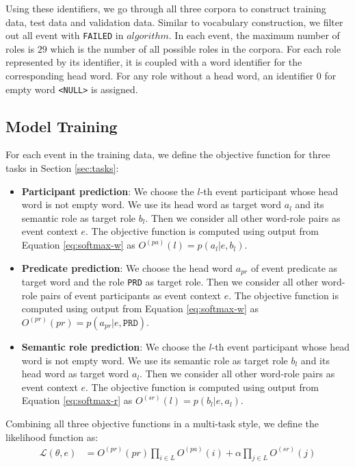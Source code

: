 \documentclass[a4paper]{article}
\begin{document}
Using these identifiers, we go through all three corpora to construct training data, test data and validation data. Similar to vocabulary construction, we filter out all event with \texttt{FAILED} in $algorithm$. In each event, the maximum number of roles is $29$ which is the number of all possible roles in the corpora. For each role represented by its identifier, it is coupled with a word identifier for the corresponding head word. For any role without a head word, an identifier $0$ for empty word \texttt{<NULL>} is assigned. 


\subsection{Model Training} \label{sec:training}
For each event in the training data, we define the objective function for three tasks in Section \ref{sec:tasks}:
\begin{itemize}
  \item  \textbf{Participant prediction}: We choose the $l$-th event participant whose head word is not empty word. We use its head word as target word $a_l$ and its semantic role as target role $b_l$. Then we consider all other word-role pairs as event context $e$. The objective function is computed using output from Equation \eqref{eq:softmax-w} as  $O^{(pa)}(l) = p(a_l | e, b_l)$. 
  \item  \textbf{Predicate prediction}: We choose the head word $a_{pr}$ of event predicate as target word and the role \texttt{PRD} as target role. Then we consider all other word-role pairs of event participants as event context $e$. The objective function is computed using output from Equation \eqref{eq:softmax-w} as  $O^{(pr)}(pr) = p(a_{pr} | e, \texttt{PRD})$. 
  \item  \textbf{Semantic role prediction}: We choose the $l$-th event participant whose head word is not empty word. We use its semantic role as target role $b_l$ and its head word as target word $a_l$. Then we consider all other word-role pairs as event context $e$. The objective function is computed using output from Equation \eqref{eq:softmax-r} as  $O^{(sr)}(l) = p(b_l | e, a_l)$. 
\end{itemize}
Combining all three objective functions in a multi-task style, we define the likelihood function as:
\begin{equation} \label{eq:likelihood}
\begin{aligned}
    \mathcal{L}(\theta, e)
        &= O^{(pr)}(pr) \prod_{i \in L} O^{(pa)}(i) + \alpha \prod_{j \in L} O^{(sr)}(j) 
\end{aligned}
\end{equation}
\end{document}
